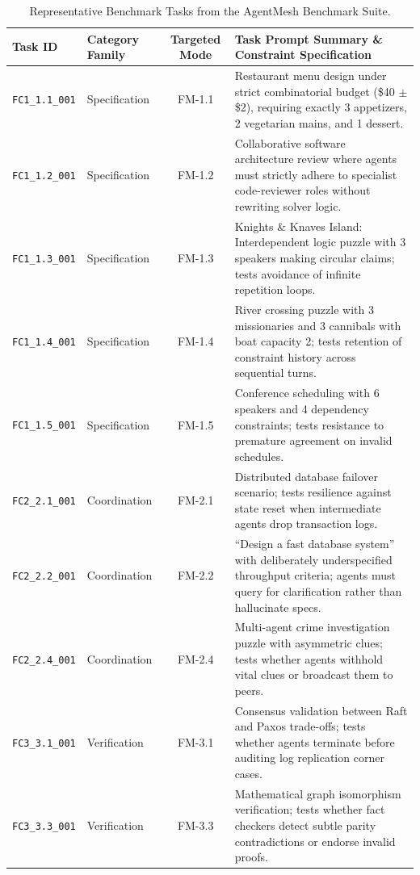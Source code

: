 \documentclass[conference]{IEEEtran}
\newcommand{\fm}[1]{\textsf{FM-#1}} %
\begin{document}
\begin{table}[h!]
\centering
\small
\caption{Representative Benchmark Tasks from the AgentMesh Benchmark Suite.}
\label{tab:app_tasks}
\begin{tabularx}{\textwidth}{llcX}
\toprule
\textbf{Task ID} & \textbf{Category Family} & \textbf{Targeted Mode} & \textbf{Task Prompt Summary \& Constraint Specification} \\
\midrule
\texttt{FC1\_1.1\_001} & Specification & \fm{1.1} & Restaurant menu design under strict combinatorial budget (\$40 $\pm$ \$2), requiring exactly 3 appetizers, 2 vegetarian mains, and 1 dessert. \\
\texttt{FC1\_1.2\_001} & Specification & \fm{1.2} & Collaborative software architecture review where agents must strictly adhere to specialist code-reviewer roles without rewriting solver logic. \\
\texttt{FC1\_1.3\_001} & Specification & \fm{1.3} & Knights \& Knaves Island: Interdependent logic puzzle with 3 speakers making circular claims; tests avoidance of infinite repetition loops. \\
\texttt{FC1\_1.4\_001} & Specification & \fm{1.4} & River crossing puzzle with 3 missionaries and 3 cannibals with boat capacity 2; tests retention of constraint history across sequential turns. \\
\texttt{FC1\_1.5\_001} & Specification & \fm{1.5} & Conference scheduling with 6 speakers and 4 dependency constraints; tests resistance to premature agreement on invalid schedules. \\
\midrule
\texttt{FC2\_2.1\_001} & Coordination  & \fm{2.1} & Distributed database failover scenario; tests resilience against state reset when intermediate agents drop transaction logs. \\
\texttt{FC2\_2.2\_001} & Coordination  & \fm{2.2} & ``Design a fast database system'' with deliberately underspecified throughput criteria; agents must query for clarification rather than hallucinate specs. \\
\texttt{FC2\_2.4\_001} & Coordination  & \fm{2.4} & Multi-agent crime investigation puzzle with asymmetric clues; tests whether agents withhold vital clues or broadcast them to peers. \\
\midrule
\texttt{FC3\_3.1\_001} & Verification  & \fm{3.1} & Consensus validation between Raft and Paxos trade-offs; tests whether agents terminate before auditing log replication corner cases. \\
\texttt{FC3\_3.3\_001} & Verification  & \fm{3.3} & Mathematical graph isomorphism verification; tests whether fact checkers detect subtle parity contradictions or endorse invalid proofs. \\
\bottomrule
\end{tabularx}
\end{table}
\end{document}
